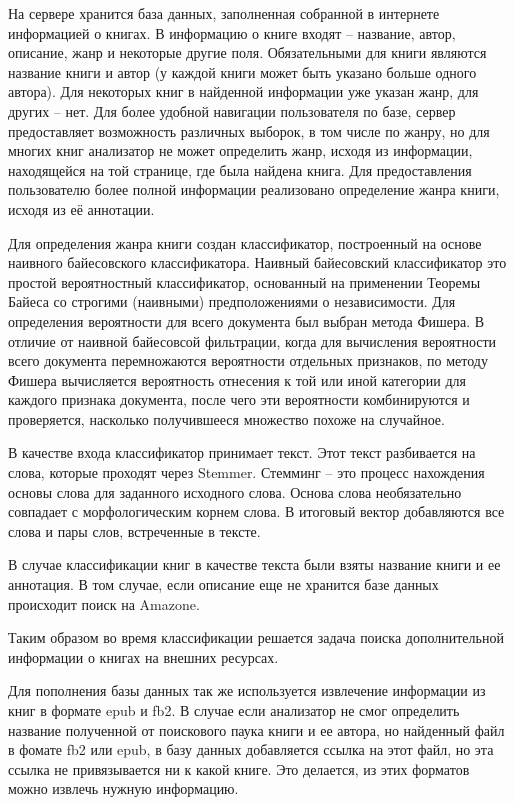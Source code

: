 \documentclass[a4paper]{report}
\begin{document}
На сервере хранится база данных, заполненная собранной в интернете информацией о книгах. В информацию о книге входят -- название, автор, описание, жанр и некоторые другие поля. Обязательными для книги являются название книги и автор (у каждой книги может быть указано больше одного автора). Для некоторых книг в найденной информации уже указан жанр, для других -- нет. Для более удобной навигации пользователя по базе, сервер предоставляет возможность различных выборок, в том числе по жанру, но для многих книг анализатор не может определить жанр, исходя из информации, находящейся на той странице, где была найдена книга. Для предоставления пользователю более полной информации реализовано определение жанра книги, исходя из её аннотации. 

Для определения жанра книги создан классификатор, построенный на основе наивного байесовского классификатора. Наивный байесовский классификатор это простой вероятностный классификатор, основанный на применении Теоремы Байеса со строгими (наивными) предположениями о независимости. Для определения вероятности для всего документа был выбран метода Фишера. 
В отличие от наивной байесовсой фильтрации, когда для вычисления вероятности всего документа перемножаются вероятности отдельных признаков, по методу Фишера вычисляется вероятность отнесения к той или иной категории для каждого признака документа, после чего эти вероятности комбинируются и проверяется, насколько получившееся множество похоже на случайное.

В качестве входа классификатор принимает текст. Этот текст разбивается на слова, которые проходят через Stemmer. Стемминг -- это процесс нахождения основы слова для заданного исходного слова. Основа слова необязательно совпадает с морфологическим корнем слова. В итоговый вектор добавляются все слова и пары слов, встреченные в тексте.

В случае классификации книг в качестве текста были взяты название книги и ее аннотация. В том случае, если описание  еще не хранится базе данных происходит поиск на Amazone.

Таким образом во время классификации решается задача поиска дополнительной информации о книгах на внешних ресурсах.


Для пополнения базы данных так же используется извлечение информации из книг в формате epub и fb2. В случае если анализатор не смог определить название полученной от поискового паука книги и ее автора, но найденный файл в фомате fb2 или epub, в базу данных добавляется ссылка на этот файл, но эта ссылка не привязывается ни к какой книге. Это делается, \tk из этих форматов можно извлечь нужную информацию. 
\end{document}
